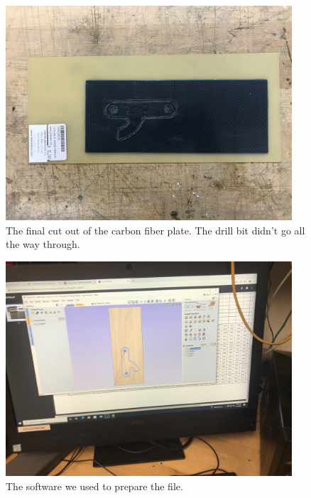 \begin{figure}[htp]
\centering
\includegraphics[width=0.95\textwidth, angle=0]{Meetings/March/03-14-22/03-14-22 1.JPG}
\caption{The final cut out of the carbon fiber plate. The drill bit didn't go all the way through.}
\label{fig:031022_1}
\end{figure}

\begin{figure}[htp]
\centering
\includegraphics[width=0.95\textwidth, angle=0]{Meetings/March/03-14-22/03-14-22 2.JPG}
\caption{The software we used to prepare the file.}
\label{fig:031022_2}
\end{figure}

